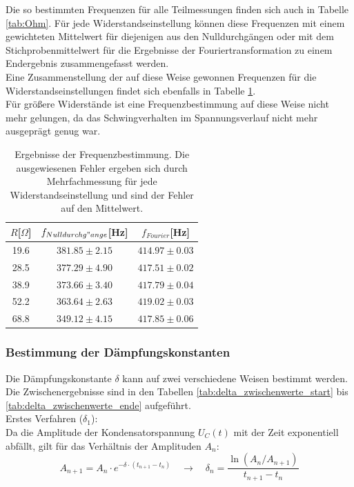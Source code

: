 \documentclass[12pt,a4paper]{article}
\begin{document}
Die so bestimmten Frequenzen für alle Teilmessungen finden sich auch in Tabelle \ref{tab:Ohm}.
Für jede Widerstandseinstellung können diese Frequenzen mit einem gewichteten Mittelwert für diejenigen aus den Nulldurchgängen oder mit dem Stichprobenmittelwert für die Ergebnisse der Fouriertransformation zu einem Endergebnis zusammengefasst werden.\\
Eine Zusammenstellung der auf diese Weise gewonnen Frequenzen für die Widerstandseinstellungen findet sich ebenfalls in Tabelle \ref{tab:Frequenzen}.\\
Für größere Widerstände ist eine Frequenzbestimmung auf diese Weise nicht mehr gelungen, da das Schwingverhalten im Spannungsverlauf nicht mehr ausgeprägt genug war.

\begin{table}
\caption{Ergebnisse der Frequenzbestimmung. Die ausgewiesenen Fehler ergeben sich durch Mehrfachmessung für jede Widerstandseinstellung und sind der Fehler auf den Mittelwert.}
\begin{center}
\begin{tabular}{|c|c|c|}
\hline
$R$[$\Omega$] & $f_{Nulldurchg"ange}$[Hz] & $f_{Fourier}$[Hz] \\
\hline
 19.6 & $381.85 \pm 2.15$ & $414.97 \pm 0.03$\\
\hline
 28.5 & $377.29 \pm 4.90$ & $417.51 \pm 0.02$\\
\hline
 38.9 & $373.66 \pm 3.40$ & $417.79 \pm 0.04$\\
\hline
 52.2 & $363.64 \pm 2.63$ & $419.02 \pm 0.03$\\
\hline
 68.8 & $349.12 \pm 4.15$ & $417.85 \pm 0.06$\\
\hline
\end{tabular}
\end{center}
\label{tab:Frequenzen}
\end{table}



\subsubsection{Bestimmung der Dämpfungskonstanten}
Die Dämpfungskonstante $\delta$ kann auf zwei verschiedene Weisen bestimmt werden. Die Zwischenergebnisse sind in den Tabellen \ref{tab:delta_zwischenwerte_start} bis \ref{tab:delta_zwischenwerte_ende} aufgeführt.\\

Erstes Verfahren ($\delta_1$):\\
Da die Amplitude der Kondensatorspannung $U_C(t)$ mit der Zeit exponentiell abfällt, gilt für das Verhältnis der Amplituden $A_n$:
\begin{equation}
A_{n+1} = A_n \cdot e^{-\delta \cdot (t_{n+1} - t_n)} \quad \rightarrow \quad \delta_n = \frac{\ln ( A_n / A_{n+1})}{t_{n+1}-t_n}
\end{equation}
\end{document}
